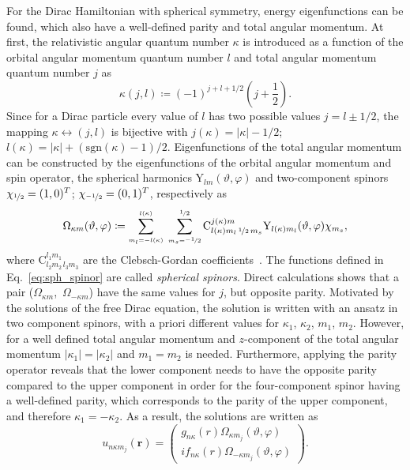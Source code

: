 For the Dirac Hamiltonian with spherical symmetry, energy eigenfunctions can be found, which also have a well-defined parity and total angular momentum. At first, the relativistic angular quantum number $\kappa$ is introduced as a function of the orbital angular momentum quantum number $l$ and total angular momentum quantum number $j$ as
\begin{equation}
\kappa(j,l) \coloneqq (-1)^{j+l+1/2} \left(j+\frac{1}{2}\right).
\end{equation}
Since for a Dirac particle every value of $l$ has two possible values $j=l\pm 1/2$, the mapping $\kappa \leftrightarrow (j,l)$ is bijective with $j(\kappa)=|\kappa|-1/2$; $l(\kappa)=|\kappa|+(\mathrm{sgn}(\kappa)-1)/2$. Eigenfunctions of the total angular momentum can be constructed by the eigenfunctions of the orbital angular momentum and spin operator, the spherical harmonics $\text{Y}_{lm}(\vartheta,\varphi)$ and two-component spinors $\chi_{\nicefrac{1}{2}}=(1,0)^T$; $\chi_{\nicefrac{-1}{2}}=(0,1)^T$, respectively as
\begin{equation}
\Omega_{\kappa m}(\vartheta,\varphi)\coloneqq
\sum_{{\scriptscriptstyle {m_l}{=}{-l(\kappa)}}}^{\scriptscriptstyle l(\kappa)}\;
\sum_{{\scriptscriptstyle {m_s}{=}{\nicefrac{-1}{2}}}}^{\scriptscriptstyle \nicefrac{1}{2}}
\text{C}^{j(\kappa)m}_{l(\kappa)m_l\,\nicefrac{1}{2}\,m_s}
\text{Y}_{l(\kappa)m_l}(\vartheta,\varphi)\chi_{m_s},
\label{eq:sph_spinor}
\end{equation}
where $\text{C}^{l_1m_1}_{l_2m_2\,l_3m_3}$ are the Clebsch-Gordan coefficients~\cite{varshalovich1988}. The functions defined in Eq.~\eqref{eq:sph_spinor} are called \textit{spherical spinors}. Direct calculations shows that a pair \mbox{($\Omega_{\kappa m}$, $\Omega_{-\kappa m}$)} have the same values for $j$, but opposite parity. Motivated by the solutions of the free Dirac equation, the solution is written with an ansatz in two component spinors, with a priori different values for $\kappa_1$, $\kappa_2$, $m_1$, $m_2$. 
However, for a well defined total angular momentum and $z$-component of the total angular momentum $|\kappa_1|=|\kappa_2|$ and $m_1=m_2$ is needed. Furthermore, applying the parity operator reveals that the lower component needs to have the opposite parity compared to the upper component in order for the four-component spinor having a well-defined parity, which corresponds to the parity of the upper component, and therefore $\kappa_1=-\kappa_2$. As a result, the solutions are written as
\begin{equation}
u_{n\kappa m_j}(\mathbf{r})=
\begin{pmatrix}
g_{n\kappa}(r)\Omega_{\kappa m_j}(\vartheta,\varphi)\\
i f_{n\kappa}(r) \Omega_{-\kappa m_j}(\vartheta,\varphi)
\end{pmatrix}.
\label{eq:ansatz_dirac}
\end{equation}
